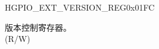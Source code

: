 \begin{register}{H}{GPIO\_EXT\_VERSION\_REG}{0x01FC}\label{regdesc:GPIOEXTVERSIONREG}
%
%
\regnewline%
\begin{regdesc}\begin{reglist}
\label{fielddesc:GPIOEXTDATE}\item [GPIO\_EXT\_DATE] 版本控制寄存器。\\ (R/W)
\end{reglist}\end{regdesc}
\end{register}


